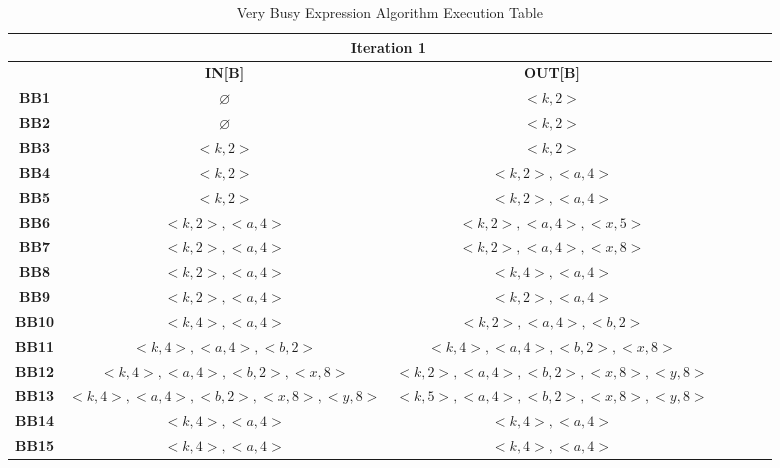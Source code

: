 \documentclass{article}
\begin{document}
\begin{table}[H]
\centering
\begin{tabular}{|c|c|c|c|c|c|c|}
\hline
   & \multicolumn{2}{c|}{\textbf{Iteration 1}}  \\ \hline
   & \textbf{IN[B]}   & \textbf{OUT[B]}  \\ \hline
    \textbf{BB1} & $\varnothing$ & $<k,2>$  \\ \hline
    \textbf{BB2} & $\varnothing$ & $<k,2>$  \\ \hline
    \textbf{BB3} & $<k,2>$ & $<k,2>$  \\ \hline
    \textbf{BB4} & $<k,2>$ & $<k,2>, <a, 4>$  \\ \hline
    \textbf{BB5} & $<k,2>$ & $<k,2>, <a, 4>$  \\ \hline
    \textbf{BB6} & $<k,2>, <a, 4>$ & $<k,2>, <a, 4>, <x, 5>$ \\ \hline
    \textbf{BB7} & $<k,2>, <a, 4>$ & $<k,2>, <a, 4>, <x, 8>$  \\ \hline
    \textbf{BB8} &  $<k,2>, <a, 4>$ & $<k,4>, <a, 4>$   \\ \hline
    \textbf{BB9} &  $<k,2>, <a, 4>$ & $<k,2>, <a, 4>$  \\ \hline
    \textbf{BB10} &  $<k,4>, <a, 4>$ & $<k,2>, <a, 4>, <b,2>$   \\ \hline
    \textbf{BB11} &  $<k,4>, <a, 4>, <b,2>$ & $<k,4>, <a, 4>, <b,2>, <x,8>$  \\ \hline
    \textbf{BB12} & $<k,4>, <a, 4>, <b,2>, <x,8>$ & $<k,2>, <a, 4>, <b,2>, <x,8>, <y,8>$ \\ \hline
    \textbf{BB13} &  $<k,4>, <a, 4>, <b,2>, <x,8>, <y,8>$   &  $<k,5>, <a, 4>, <b,2>, <x,8>, <y,8>$  \\ \hline
    \textbf{BB14} &  $<k,4>, <a, 4>$ & $<k,4>, <a, 4>$  \\ \hline
    \textbf{BB15} &  $<k,4>, <a, 4>$ & $<k,4>, <a, 4>$  \\ \hline
\end{tabular}
\caption{Very Busy Expression Algorithm Execution Table}
\end{table}
\end{document}
